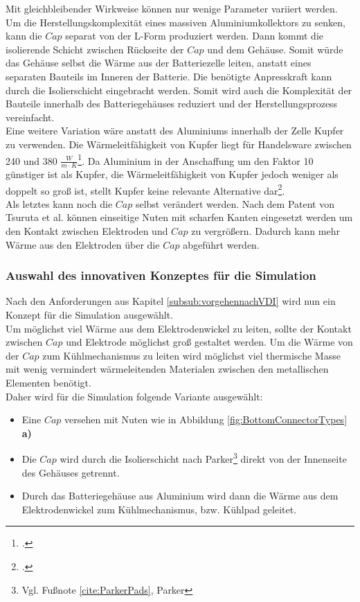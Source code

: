 Mit gleichbleibender Wirkweise können nur wenige Parameter variiert werden. \\
Um die Herstellungskomplexität eines massiven Aluminiumkollektors zu senken, kann die $Cap$ separat von der L-Form produziert werden. Dann kommt die isolierende Schicht zwischen Rückseite der $Cap$ und dem Gehäuse. Somit würde das Gehäuse selbst die Wärme aus der Batteriezelle leiten, anstatt eines separaten Bauteils im Inneren der Batterie. Die benötigte Anpresskraft kann durch die Isolierschicht eingebracht werden. Somit wird auch die Komplexität der Bauteile innerhalb des Batteriegehäuses reduziert und der Herstellungsprozess vereinfacht.\\
Eine weitere Variation wäre anstatt des Aluminiums innerhalb der Zelle Kupfer zu verwenden. Die Wärmeleitfähigkeit von Kupfer liegt für Handelsware zwischen 240 und 380 $\frac{W}{m \cdot K}$\footcite[Vgl.][]{Myers.2009}. Da Aluminium in der Anschaffung um den Faktor 10 günstiger ist als Kupfer, die Wärmeleitfähigkeit von Kupfer jedoch weniger als doppelt so groß ist, stellt Kupfer keine relevante Alternative dar\footcite[Vgl.][]{Doduco.2021}.\\
Als letztes kann noch die $Cap$ selbst verändert werden. Nach dem Patent von Tsuruta et al. können einseitige Nuten mit scharfen Kanten eingesetzt werden um den Kontakt zwischen Elektroden und $Cap$ zu vergrößern. Dadurch kann mehr Wärme aus den Elektroden über die $Cap$ abgeführt werden.

\subsubsection*{Auswahl des innovativen Konzeptes für die Simulation}

Nach den Anforderungen aus Kapitel \ref{subsub:vorgehennachVDI} wird nun ein Konzept für die Simulation ausgewählt.\\
Um möglichst viel Wärme aus dem Elektrodenwickel zu leiten, sollte der Kontakt zwischen $Cap$ und Elektrode möglichst groß gestaltet werden. Um die Wärme von der $Cap$ zum Kühlmechanismus zu leiten wird möglichst viel thermische Masse mit wenig vermindert wärmeleitenden Materialen zwischen den metallischen Elementen benötigt.\\ 
Daher wird für die Simulation folgende Variante ausgewählt:\\

\begin{itemize}
	\item Eine $Cap$ versehen mit Nuten wie in Abbildung \ref{fig:BottomConnectorTypes} \textbf{a)}
	\item Die $Cap$ wird durch die Isolierschicht nach Parker\footnote{Vgl. Fußnote \ref{cite:ParkerPads}, Parker} direkt von der Innenseite des Gehäuses getrennt.
	\item Durch das Batteriegehäuse aus Aluminium wird dann die Wärme aus dem Elektrodenwickel zum Kühlmechanismus, bzw. Kühlpad geleitet.
\end{itemize}



